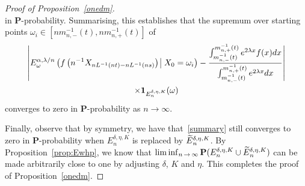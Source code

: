 \documentclass[10pt]{amsart}
\theoremstyle{definition}\newtheorem{defi}[theo]{Definition}\newtheorem{rema}[theo]{Remark}\newtheorem{exam}[theo]{Example}\newtheorem{exem}[theo]{Example}\newtheorem{nota}[theo]{Notation}
\newcommand{\bfP}{\mathbf{P}}
\newcommand{\bfun}{\mathbf{1}}
\let\oldtilde\tilde
\renewcommand*{\tilde}[1]{\mathchoice{\widetilde{#1}}{\widetilde{#1}}{\oldtilde{#1}}{\oldtilde{#1}}}
\begin{document}
\begin{proof}[Proof of Proposition~\ref{onedm}]
\[\]
in $\bfP$-probability. Summarising, this establishes that the supremum over starting points $\omega_i\in [nm_{n,-}^{-1}(t),nm_{n,+}^{-1}(t)]$ of
\begin{multline}\label{summary}
\left|{E}^{\alpha,\lambda/n}_\omega\left(f\left(n^{-1}{X}_{nL^{-1}(nt)-nL^{-1}(ns)}\right)\:\vline\:X_0=\omega_i\right)-\frac{\int_{m_{n,-}^{-1}(t)}^{m_{n,+}^{-1}(t)}e^{2\lambda x}f(x)dx}{\int_{m_{n,-}^{-1}(t)}^{m_{n,+}^{-1}(t)}e^{2\lambda x}dx}\right|\\
\times\bfun_{E_n^{\delta,\eta,K}}(\omega)
\end{multline}
converges to zero in $\bfP$-probability as $n\to\infty$.

Finally, observe that by symmetry, we have that~\eqref{summary} still converges to zero in $\bfP$-probability when ${E}_n^{\delta,\eta,K}$ is replaced by $\tilde{E}_n^{\delta,\eta,K}$. By Proposition~\ref{prop:Ewhp}, we know that $\liminf_{n\,\rightarrow\,\infty} \bfP({E}_n^{\delta,\eta,K}\cup \tilde{E}_n^{\delta,\eta,K})$ can be made arbitrarily close to one by adjusting $\delta$, $K$ and $\eta$. This completes the proof of Proposition~\ref{onedm}.
\end{proof}
\end{document}
